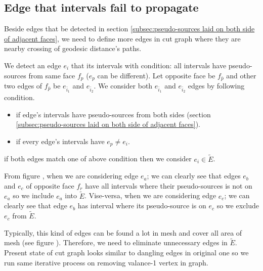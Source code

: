\documentclass[a4paper,twoside]{article}
\begin{document}
\subsection{Edge that intervals fail to propagate}
\label{subsec:intervals fail to propagate}
Beside edges that be detected in section \ref{subsec:pseudo-sources laid on both side of adjacent faces},  we need to define more edges in cut graph where they are nearby crossing of geodesic distance's paths. 

We detect an edge $e_i$ that its intervals with condition: all intervals have pseudo-sources from same face $f_p$ ($e_p$ can be different). Let opposite face be $f_{\bar{p}}$ and other two edges of $f_{\bar{p}}$ be $e_{\bar{i}_1}$ and $e_{\bar{i}_2}$. We consider both $e_{\bar{i}_1}$ and $e_{\bar{i}_2}$ edges by following condition.
\begin{itemize}
	\item if edge's intervals have pseudo-sources from both sides (section \ref{subsec:pseudo-sources laid on both side of adjacent faces}).
	\item if every edge's intervals have $e_p \neq e_i$.
\end{itemize}

if both edges match one of above condition then we consider $e_i \in \tilde{E}$. 

From figure , when we are considering edge $e_a$; we can clearly see that edges $e_b$ and $e_c$ of opposite face $f_r$ have all intervals where their pseudo-sources is not on $e_a$ so we include $e_a$ into $\tilde{E}$. Vise-versa, when we are considering edge $e_c$; we can clearly see that edge $e_b$ has interval where its pseudo-source is on $e_c$ so we exclude $e_c$ from $\tilde{E}$.

Typically, this kind of edges can be found a lot in mesh and cover all area of mesh (see figure ). Therefore, we need to eliminate unnecessary edges in $\tilde{E}$. Present state of cut graph looks similar to dangling edges in original one so we run same iterative process on removing valance-1 vertex in graph. 
\end{document}
